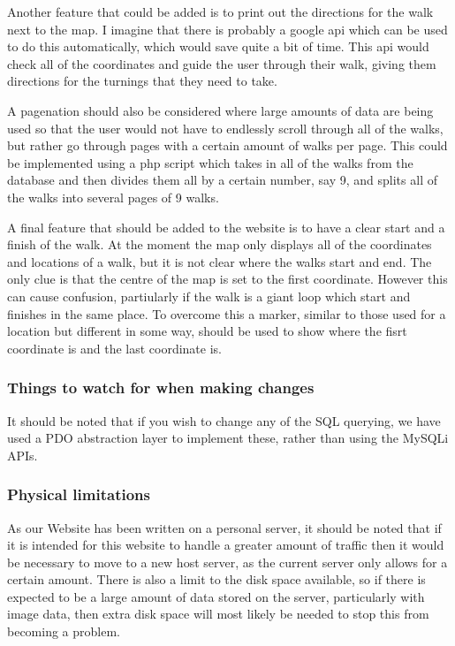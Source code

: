 \documentclass{project}
\begin{document}
  Another feature that could be added is to print out the directions for the walk next to the map. I imagine that there is probably a google api which can be used to do this automatically, which would save quite a bit of time. This api would check all of the  coordinates and guide the user through their walk, giving them directions for the turnings that they need to take.

  A pagenation should also be considered where large amounts of data are being used so that the user would not have to endlessly scroll through all of the walks, but rather go through pages with a certain amount of walks per page. This could be implemented using a php script which takes in all of the walks from the database and then divides them all by a certain number, say 9, and splits all of the walks into several pages of 9 walks.

  A final feature that should be added to the website is to have a clear start and a finish of the walk. At the moment the map only displays all of the coordinates and locations of a walk, but it is not clear where the walks start and end. The only clue is that the centre of the map is set to the first coordinate. However this can cause confusion, partiularly if the walk is a giant loop which start and finishes in the same place. To overcome this a marker, similar to those used for a location but different in some way, should be used to show where the fisrt coordinate is and the last coordinate is.
  
\subsubsection{Things to watch for when making changes}
It should be noted that if you wish to change any of the SQL querying, we have used a PDO abstraction layer to implement these, rather than using the MySQLi APIs.

\subsubsection{Physical limitations}
As our Website has been written on a personal server, it should be noted that if it is intended for this website to handle a greater amount of traffic then it would be necessary to move to a new host server, as the current server only allows for a certain amount. There is also a limit to the disk space available, so if there is expected to be a large amount of data stored on the server, particularly with image data, then extra disk space will most likely be needed to stop this from becoming a problem.
\end{document}
